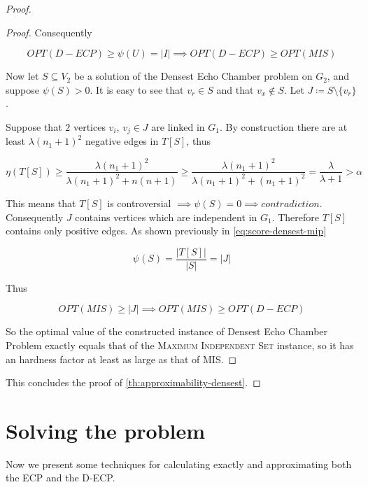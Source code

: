 \begin{proof}
\begin{proof}
		Consequently

		\begin{equation}
			OPT(D-ECP) \geq \psi(U) = |I| \implies OPT(D-ECP) \geq OPT(MIS)
		\end{equation}

		Now let $S \subseteq V_2$ be a solution of the Densest Echo Chamber
		problem on $G_2$, and suppose $\psi(S) > 0$. It is easy to see that
		$v_{r} \in S$ and that $v_{x} \not\in S $. Let $J \coloneqq S \setminus
			\{v_r\}$.

		Suppose that $2$ vertices $v_{i} $, $v_{j} \in J$ are linked in $G_1$.
		By construction there are at least $\lambda (n_1 + 1)^{2} $ negative edges in
		$T[S]$, thus

		\begin{equation}
			\eta(T[S]) \geq \frac{\lambda (n_1+1)^2}{\lambda (n_1+1)^2 + n(n+1)} \geq
			\frac{\lambda (n_1+1)^{2} }{\lambda (n_1+1)^2 + (n_1+1)^2} = \frac{\lambda }{\lambda +
				1} > \alpha
		\end{equation}

		This means that $T[S]$ is controversial $\implies \psi(S) = 0
			\implies contradiction$. Consequently $J$
		contains vertices which are independent in $G_1$. Therefore $T[S]$ contains
		only positive edges. As shown previously in
		\autoref{eq:score-densest-mip}

		\begin{equation}
			\psi(S) = \frac{|T[S]|}{|S|} = |J|
		\end{equation}

		Thus

		\begin{equation}
			OPT(MIS) \geq |J| \implies OPT(MIS) \geq OPT(D-ECP)
		\end{equation}

		So the optimal value of the constructed instance of Densest Echo Chamber Problem
		exactly equals that of the \textsc{Maximum Independent Set} instance, so it
		has an hardness factor at least as large as that of MIS.
	\end{proof}

	This concludes the proof of \autoref{th:approximability-densest}.
\end{proof}

\section{Solving the problem}%
\label{sec:solving_the_problem}

Now we present some techniques for calculating exactly and approximating both
the \acrshort{ECP} and the \acrshort{D-ECP}.

